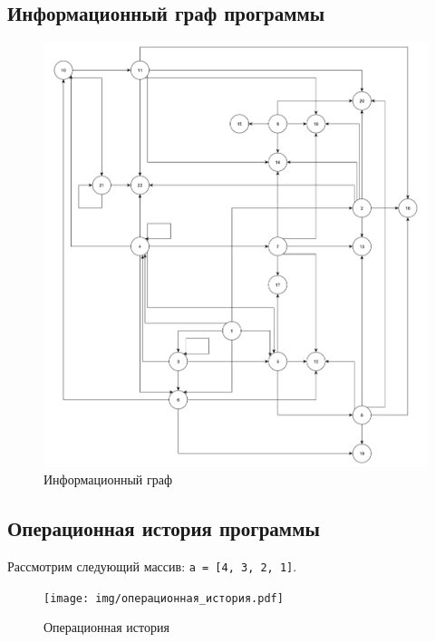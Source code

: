 \clearpage

\subsection{Информационный граф программы}

\begin{figure}[h]
	\centering
	\label{fg:ig}
	\includegraphics[height=0.5\textheight, page=1]{img/информационный_граф.pdf}
	\caption{Информационный граф}
\end{figure}

\clearpage

\subsection{Операционная история программы}

Рассмотрим следующий массив: \texttt{a = [4, 3, 2, 1]}.

\begin{figure}[h]
	\centering
	\label{fg:os}
	\texttt{[image: img/операционная\_история.pdf]}
	\caption{Операционная история}
\end{figure}

\clearpage

